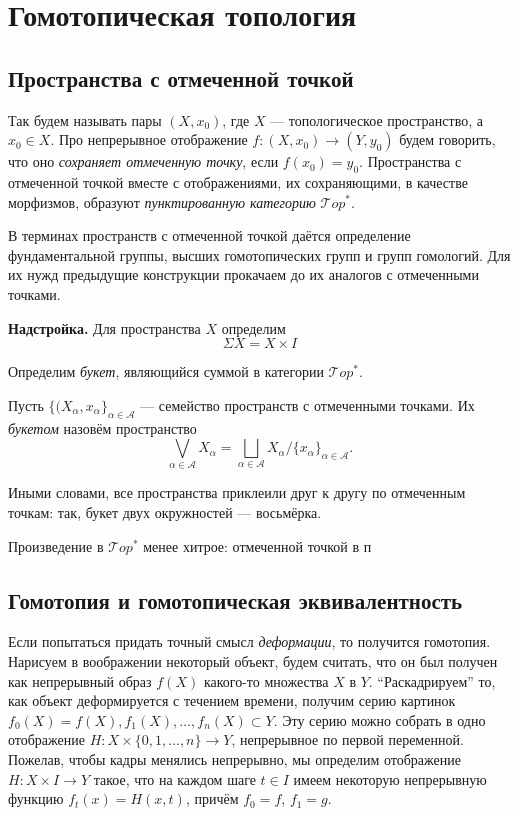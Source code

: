 \section{Гомотопическая топология}
\subsection{Пространства с отмеченной точкой}
Так будем называть пары $(X,x_0)$, где $X$ --- топологическое пространство, а $x_0\in X$. Про непрерывное отображение $f\colon(X,x_0)\to (Y,y_0)$ будем говорить, что оно \textit{сохраняет отмеченную точку}, если $f(x_0)=y_0$. Пространства с отмеченной точкой вместе с отображениями, их сохраняющими, в качестве морфизмов, образуют \textit{пунктированную категорию} $\mathcal{T}op^*$.

В терминах пространств с отмеченной точкой даётся определение фундаментальной группы, высших гомотопических групп и групп гомологий. Для их нужд предыдущие конструкции прокачаем до их аналогов с отмеченными точками.

\textbf{Надстройка.} Для пространства $X$ определим
	\begin{equation*}
		\Sigma X=X\times I
	\end{equation*}

Определим \textit{букет}, являющийся суммой в категории $\mathcal{T}op^*$.
\begin{defin}
	Пусть $\{(X_{\alpha},x_{\alpha}\}_{\alpha\in\mathcal{A}}$ --- семейство пространств с отмеченными точками. Их \textit{букетом} назовём пространство
		\begin{equation*}
			\bigvee\limits_{\alpha\in\mathcal{A}}X_{\alpha}=\bigsqcup\limits_{\alpha\in\mathcal{A}}X_{\alpha}\big/\{x_\alpha\}_{\alpha\in\mathcal{A}}.
		\end{equation*}
\end{defin}
Иными словами, все пространства приклеили друг к другу по отмеченным точкам: так, букет двух окружностей --- восьмёрка.

Произведение в $\mathcal{T}op^*$ менее хитрое: отмеченной точкой в п

\subsection{Гомотопия и гомотопическая эквивалентность}
Если попытаться придать точный смысл \textit{деформации}, то получится гомотопия. Нарисуем в воображении некоторый объект, будем считать, что он был получен как непрерывный образ $f(X)$ какого-то множества $X$ в $Y$. ``Раскадрируем'' то, как объект деформируется с течением времени, получим серию картинок $f_0(X)=f(X), f_1(X),\ldots, f_n(X)\subset Y$. Эту серию можно собрать в одно отображение $H\colon X\times\{0,1,\ldots,n\}\to Y$, непрерывное по первой переменной. Пожелав, чтобы кадры менялись непрерывно, мы определим отображение $H\colon X\times I\to Y$ такое, что на каждом шаге $t\in I$ имеем некоторую непрерывную функцию $f_t(x)=H(x,t)$, причём $f_0=f$, $f_1=g$.

